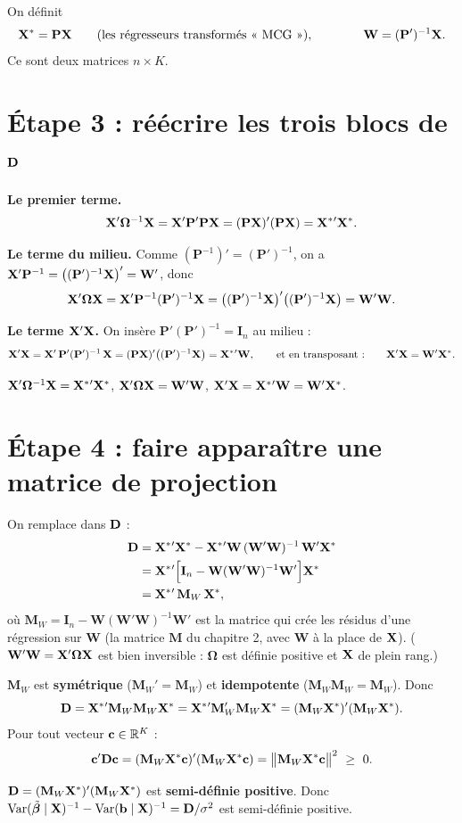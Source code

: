 \documentclass[11pt,a4paper]{article}
\newcommand{\Xs}{\mathbf{X}^{*}}\newcommand{\W}{\mathbf{W}}
\newcommand{\I}{\mathbf{I}}\newcommand{\Pm}{\mathbf{P}}\newcommand{\Om}{\bm{\Omega}}
\newcommand{\Mw}{\mathbf{M}_W}
\newcommand{\Var}{\operatorname{Var}}\newcommand{\E}{\mathbb{E}}
\begin{document}
On définit
\[
\Xs=\Pm\vX\qquad\text{(les régresseurs transformés « MCG »)},\qquad\qquad \W=(\Pm')^{-1}\vX .
\]
Ce sont deux matrices $n\times K$.

\section*{Étape 3 : réécrire les trois blocs de $\mathbf{D}$}

\textbf{Le premier terme.}
\[
\vX'\Om^{-1}\vX=\vX'\Pm'\Pm\vX=(\Pm\vX)'(\Pm\vX)=\Xs{}'\Xs .
\]

\textbf{Le terme du milieu.} Comme $(\Pm^{-1})'=(\Pm')^{-1}$, on a $\vX'\Pm^{-1}=\big((\Pm')^{-1}\vX\big)'=\W'$, donc
\[
\vX'\Om\vX=\vX'\Pm^{-1}(\Pm')^{-1}\vX=\big((\Pm')^{-1}\vX\big)'\big((\Pm')^{-1}\vX\big)=\W'\W .
\]

\textbf{Le terme $\mathbf{X}'\mathbf{X}$.} On insère $\Pm'(\Pm')^{-1}=\I_n$ au milieu :
\[
\vX'\vX=\vX'\,\Pm'(\Pm')^{-1}\,\vX=(\Pm\vX)'\big((\Pm')^{-1}\vX\big)=\Xs{}'\W,
\qquad\text{et en transposant :}\qquad \vX'\vX=\W'\Xs .
\]

\begin{resultat}
$\vX'\Om^{-1}\vX=\Xs{}'\Xs$, \qquad $\vX'\Om\vX=\W'\W$, \qquad $\vX'\vX=\Xs{}'\W=\W'\Xs$.
\end{resultat}

\section*{Étape 4 : faire apparaître une matrice de projection}

On remplace dans $\mathbf{D}$ :
\begin{align*}
\D&=\Xs{}'\Xs-\Xs{}'\W\,(\W'\W)^{-1}\,\W'\Xs\\
&=\Xs{}'\Big[\I_n-\W(\W'\W)^{-1}\W'\Big]\Xs\\
&=\Xs{}'\,\Mw\,\Xs ,
\end{align*}
où $\Mw=\I_n-\W(\W'\W)^{-1}\W'$ est la matrice qui crée les résidus d'une régression sur $\W$ (la matrice $\mathbf M$ du chapitre 2, avec $\W$ à la place de $\mathbf{X}$). ($\W'\W=\vX'\Om\vX$ est bien inversible : $\Om$ est définie positive et $\mathbf{X}$ de plein rang.)

$\Mw$ est \textbf{symétrique} ($\Mw'=\Mw$) et \textbf{idempotente} ($\Mw\Mw=\Mw$). Donc
\[
\D=\Xs{}'\Mw\Mw\Xs=\Xs{}'\Mw'\Mw\Xs=(\Mw\Xs)'(\Mw\Xs).
\]
Pour tout vecteur $\mathbf{c}\in\mathbb R^K$ :
\[
\vc'\D\vc=(\Mw\Xs\vc)'(\Mw\Xs\vc)=\big\|\Mw\Xs\vc\big\|^2\ \ge\ 0 .
\]

\begin{resultat}
$\D=(\Mw\Xs)'(\Mw\Xs)$ est \textbf{semi-définie positive}. Donc $\Var(\tbeta\mid\vX)^{-1}-\Var(\vb\mid\vX)^{-1}=\D/\sigma^2$ est semi-définie positive.
\end{resultat}
\end{document}
